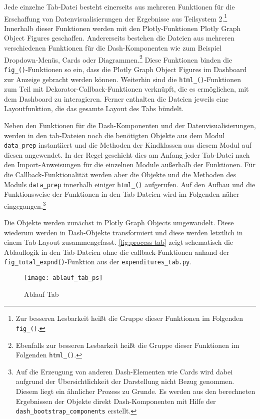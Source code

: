     Jede einzelne Tab-Datei besteht einerseits aus mehreren Funktionen für die Erschaffung von Datenvisualisierungen der
    Ergebnisse aus Teilsystem 2.\footnote{ Zur besseren Lesbarkeit heißt die Gruppe dieser Funktionen im Folgenden \texttt{fig\_()}.}
    Innerhalb dieser Funktionen werden mit den Plotly-Funktionen Plotly Graph Object Figures geschaffen. 
    Andererseits bestehen die Dateien aus mehreren verschiedenen Funktionen für die Dash-Komponenten wie zum Beispiel Dropdown-Menüs, Cards oder Diagrammen.\footnote{ Ebenfalls zur besseren Lesbarkeit
    heißt die Gruppe dieser Funktionen im Folgenden \texttt{html\_()}.}
    Diese Funktionen binden die \texttt{fig\_()}-Funktionen so ein, dass die Plotly Graph Object Figures im Dashboard zur Anzeige gebracht werden können. 
    Weiterhin sind die \texttt{html\_()}-Funktionen zum Teil mit Dekorator-Callback-Funktionen verknüpft, die es ermöglichen, mit dem Dashboard zu interagieren. 
    Ferner enthalten die Dateien jeweils eine Layoutfunktion, die das gesamte Layout des Tabs bündelt.

    Neben den Funktionen für die Dash-Komponenten und der Datenvisualisierungen, werden in den tab-Dateien noch die benötigten Objekte aus dem Modul \texttt{data\_prep} 
    instantiiert und die Methoden der Kindklassen aus diesem Modul auf diesen angewendet. In der Regel geschieht dies am Anfang 
    jeder Tab-Datei nach den Import-Anweisungen für die einzelnen Module außerhalb der Funktionen. Für die Callback-Funktionalität werden aber die Objekte und die Methoden des Moduls \texttt{data\_prep} innerhalb einiger \texttt{html\_()} aufgerufen.
    Auf den Aufbau und die Funktionsweise der Funktionen in den Tab-Dateien wird im Folgenden näher eingegangen.\footnote{ Auf die Erzeugung von anderen Dash-Elementen wie Cards wird dabei aufgrund der Übersichtlichkeit der Darstellung nicht Bezug genommen. Diesem liegt ein ähnlicher Prozess
    zu Grunde. Es werden aus den berechneten Ergebnissen der Objekte direkt Dash-Komponenten mit Hilfe der \texttt{dash\_bootstrap\_components} erstellt.}
    
    Die Objekte werden zunächst in Plotly Graph Objects umgewandelt. Diese wiederum werden in Dash-Objekte transformiert und diese werden 
    letztlich in einem Tab-Layout zusammengefasst.
    \autoref{fig:process tab} zeigt schematisch die Ablauflogik in den Tab-Dateien ohne die callback-Funktionen anhand der 
    \texttt{fig\_total\_expnd()}-Funktion aus der \texttt{expenditures\_tab.py}.
    
    
    \begin{figure}[H]
        \centering
            \texttt{[image: ablauf\_tab\_ps]}
            \caption{Ablauf Tab}
            \label{fig:process tab}
    \end{figure}

